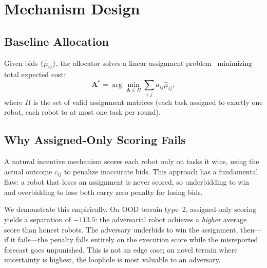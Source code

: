 \documentclass[letterpaper, 10pt, conference]{ieeeconf}
\begin{document}
\section{Mechanism Design}
\label{sec:mechanism}

\subsection{Baseline Allocation}
Given bids $\{\hat{\mu}_{ij}\}$, the allocator solves a linear assignment
problem~\cite{kuhn1955hungarian} minimizing total expected cost:
\begin{equation}
  \mathbf{A}^* = \arg\min_{\mathbf{A} \in \Pi} \sum_{i,j} a_{ij} \hat{\mu}_{ij},
  \label{eq:assignment}
\end{equation}
where $\Pi$ is the set of valid assignment matrices (each task assigned to
exactly one robot, each robot to at most one task per round).

\subsection{Why Assigned-Only Scoring Fails}
A natural incentive mechanism scores each robot only on tasks it wins, using
the actual outcome $c_{ij}$ to penalize inaccurate bids.  This approach has a
fundamental flaw: a robot that loses an assignment is never scored, so
underbidding to win and overbidding to lose both carry zero penalty for losing
bids.

We demonstrate this empirically.  On OOD terrain type~2, assigned-only scoring
yields a separation of $\mathbf{-113.5}$: the adversarial robot achieves a
\emph{higher} average score than honest robots.  The adversary underbids to win
the assignment, then---if it fails---the penalty falls entirely on the
execution score while the misreported forecast goes unpunished.  This is not an
edge case; on novel terrain where uncertainty is highest, the loophole is most
valuable to an adversary.
\end{document}
